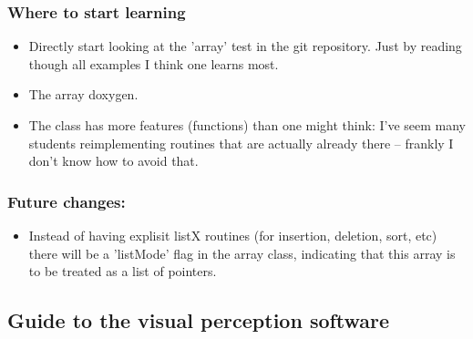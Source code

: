 \subsubsection{Where to start learning}

\begin{itemize}
\item Directly start looking at the 'array' test in the git
repository. Just by reading though all examples I think one learns
most.

\item The array doxygen.

\item The class has more features (functions) than one might think: I've
seem many students reimplementing routines that are actually already
there -- frankly I don't know how to avoid that.
\end{itemize}


\subsubsection{Future changes:}

\begin{itemize}
\item Instead of having explisit listX routines (for insertion, deletion,
   sort, etc) there will be a 'listMode' flag in the array class,
   indicating that this array is to be treated as a list of pointers.
\end{itemize}


\subsection{Guide to the visual perception software}

